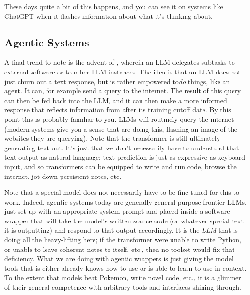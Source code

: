 
These days quite a bit of this happens, and you can see it on systems like
ChatGPT when it flashes information about what it's thinking about.
 

\subsection{Agentic Systems}


A final trend to note is the advent of , wherein an
LLM delegates subtasks to external software or to other LLM instances. The idea
is that an LLM does not just churn out a text response, but is rather empowered
to\emph{do} things, like an agent. It can, for example send a query to the
internet. The result of this query can then be fed back into the LLM, and it
can then make a more informed response that reflects information from after its
training cutoff date. By this point this is probably familiar to you. LLMs will
routinely query the internet (modern systems give you a sense that are doing
this, flashing an image of the websites they are querying). Note that the
transformer is still ultimately generating text out. It's just that we don't
necessarily have to understand that text output as natural language; text
prediction is just as expressive as keyboard input, and so transformers can be
equipped to write and run code, browse the internet, jot down persistent notes,
etc.

Note that a special model does not necessarily have to be fine-tuned for this
to work. Indeed, agentic systems today are generally general-purpose frontier
LLMs, just set up with an appropriate system prompt and placed inside a
software wrapper that will take the model's written source code (or whatever
special text it is outputting) and respond to that output accordingly. It is
the \emph{LLM} that is doing all the heavy-lifting here; if the transformer
were unable to write Python, or unable to leave coherent notes to itself, etc.,
then no toolset would fix that deficiency. What we are doing with agentic
wrappers is just giving the model tools that is either already knows how to use
or is able to learn to use in-context. To the extent that models beat Pokemon,
write novel code, etc., it is a glimmer of their general competence with
arbitrary tools and interfaces shining through.

